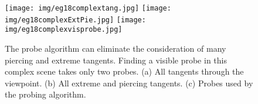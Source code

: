 \documentclass[10pt,twocolumn]{article}
\newcommand{\Comment}[1]{\relax}  %
\newif\ifJournal
\begin{document}
\begin{figure}[h]
\begin{center}
\texttt{[image: img/eg18complextang.jpg]}
\texttt{[image: img/eg18complexExtPie.jpg]}
\texttt{[image: img/eg18complexvisprobe.jpg]}
\end{center}
\caption{The probe algorithm can eliminate the consideration of many piercing and 
         extreme tangents.
	 Finding a visible probe in this complex scene takes only two probes.
         (a) All tangents through the viewpoint.
         (b) All extreme and piercing tangents.
         (c) Probes used by the probing algorithm.}
\label{fig:eg18complex}
\end{figure}


\ifJournal %
\vspace{-.2in}

\section{Examples}
\label{sec:eg}

REAL LIVE NON-TOY TEST CASES? BUILDING FOOTPRINTS IN A REAL CITY OR REAL BLOCK?
SEE VIENNA DATA
\fi

\Comment{
too fragile:
Monkey with object behind hands (nazcamonkeycomplex):
an example with one line of sight feeding through several objects, 
and several false alarms.

\begin{figure}
\begin{center}
\end{center}
\caption{Finding the visible probe for a complex object}
\label{}
\end{figure}
}

\end{document}
